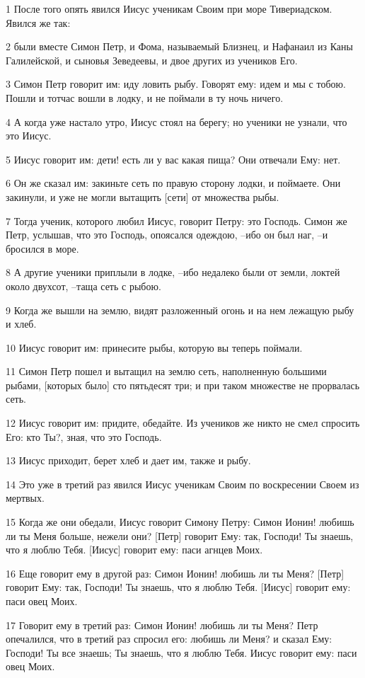 \par 1 После того опять явился Иисус ученикам Своим при море Тивериадском. Явился же так:
\par 2 были вместе Симон Петр, и Фома, называемый Близнец, и Нафанаил из Каны Галилейской, и сыновья Зеведеевы, и двое других из учеников Его.
\par 3 Симон Петр говорит им: иду ловить рыбу. Говорят ему: идем и мы с тобою. Пошли и тотчас вошли в лодку, и не поймали в ту ночь ничего.
\par 4 А когда уже настало утро, Иисус стоял на берегу; но ученики не узнали, что это Иисус.
\par 5 Иисус говорит им: дети! есть ли у вас какая пища? Они отвечали Ему: нет.
\par 6 Он же сказал им: закиньте сеть по правую сторону лодки, и поймаете. Они закинули, и уже не могли вытащить [сети] от множества рыбы.
\par 7 Тогда ученик, которого любил Иисус, говорит Петру: это Господь. Симон же Петр, услышав, что это Господь, опоясался одеждою, --ибо он был наг, --и бросился в море.
\par 8 А другие ученики приплыли в лодке, --ибо недалеко были от земли, локтей около двухсот, --таща сеть с рыбою.
\par 9 Когда же вышли на землю, видят разложенный огонь и на нем лежащую рыбу и хлеб.
\par 10 Иисус говорит им: принесите рыбы, которую вы теперь поймали.
\par 11 Симон Петр пошел и вытащил на землю сеть, наполненную большими рыбами, [которых было] сто пятьдесят три; и при таком множестве не прорвалась сеть.
\par 12 Иисус говорит им: придите, обедайте. Из учеников же никто не смел спросить Его: кто Ты?, зная, что это Господь.
\par 13 Иисус приходит, берет хлеб и дает им, также и рыбу.
\par 14 Это уже в третий раз явился Иисус ученикам Своим по воскресении Своем из мертвых.
\par 15 Когда же они обедали, Иисус говорит Симону Петру: Симон Ионин! любишь ли ты Меня больше, нежели они? [Петр] говорит Ему: так, Господи! Ты знаешь, что я люблю Тебя. [Иисус] говорит ему: паси агнцев Моих.
\par 16 Еще говорит ему в другой раз: Симон Ионин! любишь ли ты Меня? [Петр] говорит Ему: так, Господи! Ты знаешь, что я люблю Тебя. [Иисус] говорит ему: паси овец Моих.
\par 17 Говорит ему в третий раз: Симон Ионин! любишь ли ты Меня? Петр опечалился, что в третий раз спросил его: любишь ли Меня? и сказал Ему: Господи! Ты все знаешь; Ты знаешь, что я люблю Тебя. Иисус говорит ему: паси овец Моих.
